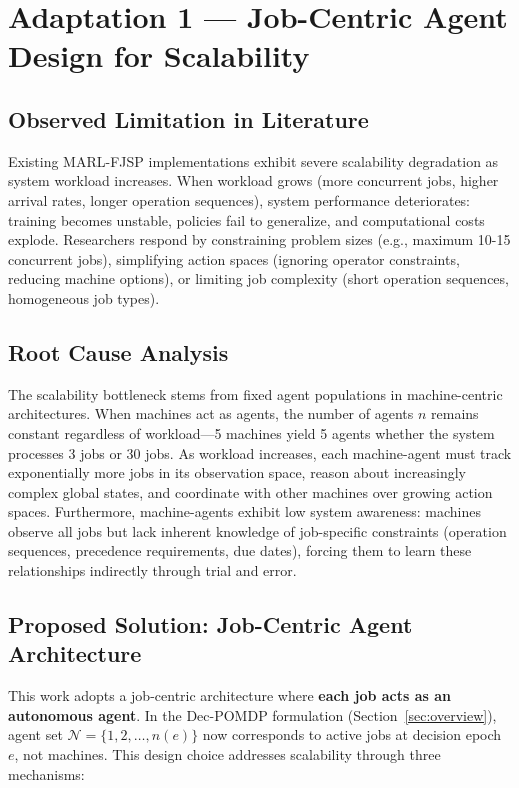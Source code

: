 \section{Adaptation 1 — Job-Centric Agent Design for Scalability}
\label{sec:scalability_adaptation}

\subsection{Observed Limitation in Literature}

Existing MARL-FJSP implementations exhibit severe scalability degradation as system workload increases. When workload grows (more concurrent jobs, higher arrival rates, longer operation sequences), system performance deteriorates: training becomes unstable, policies fail to generalize, and computational costs explode. Researchers respond by constraining problem sizes (e.g., maximum 10-15 concurrent jobs), simplifying action spaces (ignoring operator constraints, reducing machine options), or limiting job complexity (short operation sequences, homogeneous job types).

\subsection{Root Cause Analysis}

The scalability bottleneck stems from fixed agent populations in machine-centric architectures. When machines act as agents, the number of agents \( n \) remains constant regardless of workload—5 machines yield 5 agents whether the system processes 3 jobs or 30 jobs. As workload increases, each machine-agent must track exponentially more jobs in its observation space, reason about increasingly complex global states, and coordinate with other machines over growing action spaces. Furthermore, machine-agents exhibit low system awareness: machines observe all jobs but lack inherent knowledge of job-specific constraints (operation sequences, precedence requirements, due dates), forcing them to learn these relationships indirectly through trial and error.

\subsection{Proposed Solution: Job-Centric Agent Architecture}

This work adopts a job-centric architecture where \textbf{each job acts as an autonomous agent}. In the Dec-POMDP formulation (Section~\ref{sec:overview}), agent set \( \mathcal{N} = \{1, 2, \ldots, n(e)\} \) now corresponds to active jobs at decision epoch \( e \), not machines. This design choice addresses scalability through three mechanisms:

